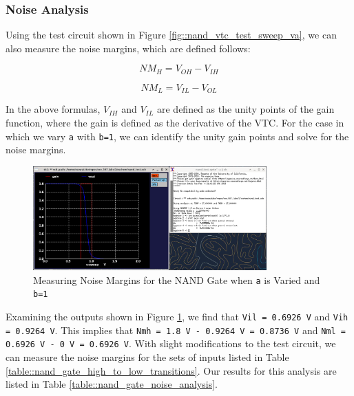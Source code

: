 \documentclass[fleqn]{article}
\begin{document}
	\subsubsection{Noise Analysis}
	\label{section::nand_noise_analysis}
	
	Using the test circuit shown in Figure \ref{fig::nand_vtc_test_sweep_va}, we can also measure the noise margins, which are defined follows:
	
	\begin{equation}
		NM_H = V_{OH} - V_{IH}
		\label{eq::noise_margin_high}
	\end{equation}
	
	\begin{equation}
		NM_L = V_{IL} - V_{OL}
		\label{eq::noise_margin_low}
	\end{equation}
	
	In the above formulas, $V_{IH}$ and $V_{IL}$ are defined as the unity points of the gain function, where the gain is defined as the derivative of the VTC. For the case in which we vary \texttt{a} with \texttt{b=1}, we can identify the unity gain points and solve for the noise margins.
	
	\begin{figure}[H]
		\centerline{\includegraphics[width=0.8\textwidth]{nand_noise_analysis_sweep_va.png}}
		\caption{Measuring Noise Margins for the NAND Gate when \texttt{a} is Varied and \texttt{b=1}}	\label{fig::nand_noise_analysis_sweep_va}
	\end{figure}
	
	Examining the outputs shown in Figure \ref{fig::nand_noise_analysis_sweep_va}, we find that \texttt{Vil = 0.6926 V} and \texttt{Vih = 0.9264 V}. This implies that \texttt{Nmh = 1.8 V - 0.9264 V = 0.8736 V} and \texttt{Nml = 0.6926 V - 0 V = 0.6926 V}. With slight modifications to the test circuit, we can measure the noise margins for the sets of inputs listed in Table \ref{table::nand_gate_high_to_low_transitions}. Our results for this analysis are listed in Table \ref{table::nand_gate_noise_analysis}.
	
\end{document}
